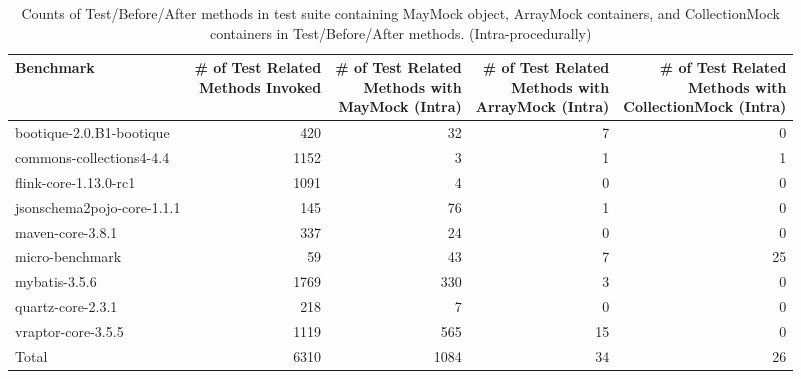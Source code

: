 \begin{table*}
	\centering
	\caption{Counts of Test/Before/After methods in test suite containing MayMock object, ArrayMock containers, and CollectionMock containers in Test/Before/After methods. (Intra-procedurally)}
	\begin{tabular}{lrrrr}
		\toprule
		Benchmark & \thead{\# of Test Related \\ Methods Invoked} & \thead{\# of Test Related \\ Methods with \\ MayMock (Intra)}  & \thead{\# of Test Related \\ Methods with \\ ArrayMock (Intra)} & \thead{\# of Test Related \\ Methods with \\ CollectionMock (Intra)} \\
		\midrule
		bootique-2.0.B1-bootique           		&  420        &  32  & 7 & 0       \\
		commons-collections4-4.4          		&  1152       &  3   & 1 & 1       \\
		flink-core-1.13.0-rc1           		&  1091       &  4   & 0 & 0       \\
		jsonschema2pojo-core-1.1.1           	&  145        &  76  & 1 & 0       \\
		maven-core-3.8.1	           			&  337        &  24  & 0 & 0       \\
		micro-benchmark         		  		&  59         &  43  & 7 & 25       \\
		mybatis-3.5.6         		  			&  1769       &  330 & 3 & 0       \\
		
		quartz-core-2.3.1         	  			&  218     	  &  7   & 0 & 0      \\
		vraptor-core-3.5.5         	  			&  1119       &  565 & 15 & 0      \\
		\bottomrule
		Total        	  						&  6310       &  1084  & 34 & 26    \\
	\end{tabular}
	\label{tab:mocks}
\end{table*}

